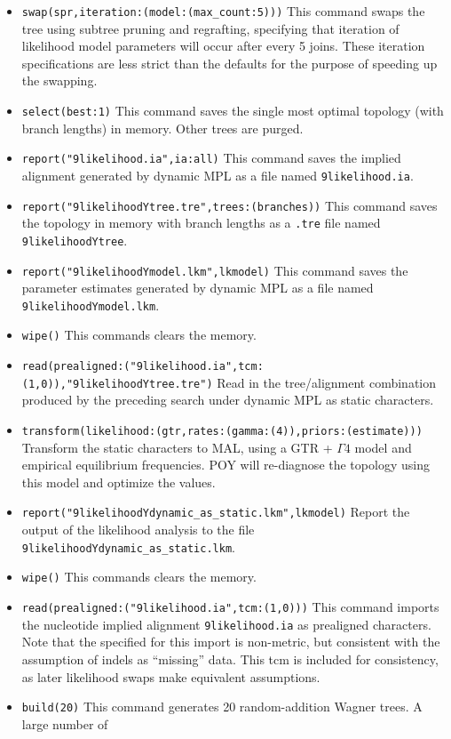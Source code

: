 \begin{itemize}
\item \texttt{swap(spr,iteration:(model:(max\_count:5)))} This command swaps the tree using subtree pruning and 
regrafting, specifying that iteration of likelihood model parameters will occur after every 5 joins. These iteration 
specifications are less strict than the defaults for the purpose of speeding up the swapping.
\item \texttt{select(best:1)} This command saves the single most optimal topology (with branch lengths) in 
memory. Other trees are purged.
\item \texttt{report("9likelihood.ia",ia:all)} This command saves the implied
    alignment generated by dynamic MPL as a file named \texttt{9likelihood.ia}.
\item \texttt{report("9likelihoodYtree.tre",trees:(branches))} This command saves the topology in memory with 
branch lengths as a \texttt{.tre} file named \texttt{9likelihoodYtree}.
\item \texttt{report("9likelihoodYmodel.lkm",lkmodel)} This command saves the parameter estimates generated 
by dynamic MPL as a file named \texttt{9likelihoodYmodel.lkm}.
\item \texttt{wipe()} This commands clears the memory.
\item \texttt{read(prealigned:("9likelihood.ia",tcm:(1,0)),"9likelihoodYtree.tre")} Read in the tree/alignment 
combination produced by the preceding search under dynamic MPL as static characters.
\item \texttt{transform(likelihood:(gtr,rates:(gamma:(4)),priors:(estimate)))} Transform the static characters to MAL, 
using a GTR + $\Gamma 4$ model and empirical equilibrium frequencies. POY will re-diagnose the topology 
using this model and optimize the values.
\item \texttt{report("9likelihoodYdynamic\_as\_static.lkm",lkmodel)} Report the output of the likelihood analysis to
 the file \texttt{9likelihoodYdynamic\_as\_static.lkm}.
\item \texttt{wipe()} This commands clears the memory.
\item \texttt{read(prealigned:("9likelihood.ia",tcm:(1,0)))} This command
    imports the nucleotide implied alignment \texttt{9likelihood.ia} as prealigned characters. Note that the 
     specified for this import is non-metric, but consistent with the assumption of indels as 
    ``missing'' data. This tcm is included for consistency, as later likelihood swaps make equivalent assumptions.
\item \texttt{build(20)} This command generates 20 random-addition Wagner trees. A large number of 

\end{itemize}
